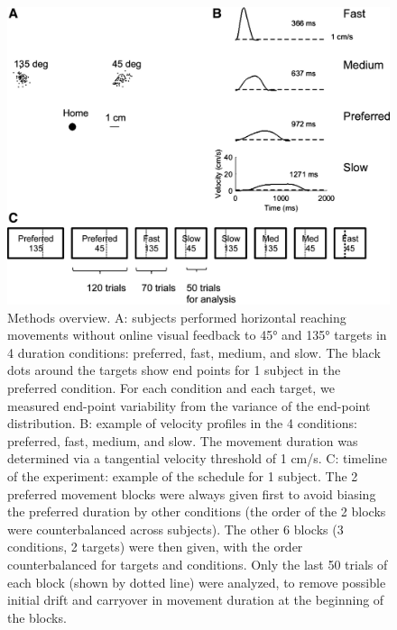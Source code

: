 \begin{figure}
	\centering
	\includegraphics[width=0.8\linewidth]{figures/MT-experiment}
	\caption[Methods overview]{Methods overview. A: subjects performed horizontal reaching movements without online visual feedback to 45° and 135° targets in 4 duration conditions: preferred, fast, medium, and slow. The black dots around the targets show end points for 1 subject in the preferred condition. For each condition and each target, we measured end-point variability from the variance of the end-point distribution. B: example of velocity profiles in the 4 conditions: preferred, fast, medium, and slow. The movement duration was determined via a tangential velocity threshold of 1 cm/s. C: timeline of the experiment: example of the schedule for 1 subject. The 2 preferred movement blocks were always given first to avoid biasing the preferred duration by other conditions (the order of the 2 blocks were counterbalanced across subjects). The other 6 blocks (3 conditions, 2 targets) were then given, with the order counterbalanced for targets and conditions. Only the last 50 trials of each block (shown by dotted line) were analyzed, to remove possible initial drift and carryover in movement duration at the beginning of the blocks.}
	\label{fig:mt-experiment}
\end{figure}

